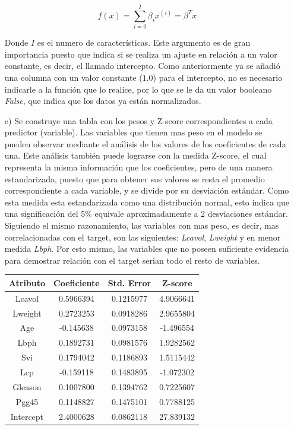 \documentclass[10pt]{article}
\begin{document}
\begin{itemize}
\begin{equation}
f(x) = \sum_{i=0}^{I} \beta_i x^{(i)} = \beta^T x
\end{equation}

Donde $I$ es el numero de características. Este argumento es de gran importancia puesto que indica si se realiza un ajuste en relación a un valor constante, es decir, el llamado intercepto. Como anteriormente ya se añadió una columna con un valor constante ($1.0$) para el intercepto, no es necesario indicarle a la función que lo realice, por lo que se le da un valor booleano \textit{False}, que indica que los datos ya están normalizados. 

\item[e)]Se construye una tabla con los pesos y Z-score correspondientes a cada predictor (variable). Las variables que tienen mas peso en el modelo se pueden observar mediante el análisis de los valores de los coeficientes de cada una. Este análisis también puede lograrse con la medida Z-score, el cual representa la misma información que los coeficientes, pero de una manera estandarizada, puesto que para obtener sus valores se resta el promedio correspondiente a cada variable, y se divide por su desviación estándar. Como esta medida esta estandarizada como una distribución normal, esto indica que una significación del 5\% equivale aproximadamente a 2 desviaciones estándar. Siguiendo el mismo razonamiento, las variables con mas peso, es decir, mas correlacionadas con el target, son las siguientes: \textit{Lcavol}, \textit{Lweight} y en menor medida \textit{Lbph}. Por esto mismo, las variables que no poseen suficiente evidencia para demostrar relación con el target serian todo el resto de variables.

\begin{table}[!htb]
  \begin{center}
    \begin{tabular}{|c|c|c|c|} \hline
    Atributo & Coeficiente & Std. Error & Z-score \\ \hline
    Lcavol &0.5966394 &0.1215977 &4.9066641 \\
 	Lweight & 0.2723253 &0.0918286& 2.9655804 \\
 	Age & -0.145638 &0.0973158 &-1.496554 \\
 	Lbph & 0.1892731 & 0.0981576& 1.9282562 \\
 	Svi & 0.1794042 & 0.1186893 &1.5115442 \\
 	Lcp & -0.159118 & 0.1483895 &-1.072302 \\
 	Gleason & 0.1007800 &0.1394762& 0.7225607 \\
 	Pgg45 & 0.1148827& 0.1475101 &0.7788125 \\
 	Intercept & 2.4000628& 0.0862118& 27.839132 \\ \hline
    \end{tabular}
  \end{center}
\end{table}



\end{itemize}
\end{document}
